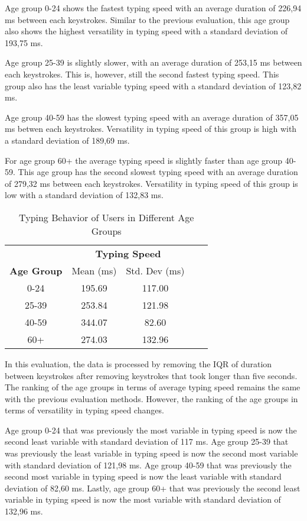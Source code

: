 Age group 0-24 shows the fastest typing speed with an average duration of 226,94 ms between each keystrokes.
Similar to the previous evaluation, this age group also shows the highest versatility in typing speed with a standard deviation of 193,75 ms.

Age group 25-39 is slightly slower, with an average duration of 253,15 ms between each keystrokes.
This is, however, still the second fastest typing speed.
This group also has the least variable typing speed with a standard deviation of 123,82 ms.

Age group 40-59 has the slowest typing speed with an average duration of 357,05 ms betwen each keystrokes.
Versatility in typing speed of this group is high with a standard deviation of 189,69 ms.

For age group 60+ the average typing speed is slightly faster than age group 40-59.
This age group has the second slowest typing speed with an average duration of 279,32 ms between each keystrokes.
Versatility in typing speed of this group is low with a standard deviation of 132,83 ms.

\begin{table}[h]
    \centering
    \begin{tabular}{ccccc}
    \toprule
    \multicolumn{1}{c}{} & \multicolumn{2}{c}{\textbf{Typing Speed}}\\
    \cmidrule(rl){2-3} \cmidrule(rl){4-5}
    \textbf{Age Group} & {Mean (ms)} & {Std. Dev (ms)} \\
    \midrule
    0-24 & 195.69 & 117.00 \\
    25-39 & 253.84 & 121.98  \\
    40-59 & 344.07 & 82.60  \\
    60+ & 274.03 & 132.96 \\
    \bottomrule
    \end{tabular}
    \caption{Typing Behavior of Users in Different Age Groups}
    \label{tab:typing_behavior_iqr}
\end{table}

In this evaluation, the data is processed by removing the \ac{IQR} of duration between keystrokes after removing keystrokes that took longer than five seconds.
The ranking of the age groups in terms of average typing speed remains the same with the previous evaluation methods.
However, the ranking of the age groups in terms of versatility in typing speed changes.

Age group 0-24 that was previously the most variable in typing speed is now the second least variable with standard deviation of 117 ms.
Age group 25-39 that was previously the least variable in typing speed is now the second most variable with standard deviation of 121,98 ms.
Age group 40-59 that was previously the second most variable in typing speed is now the least variable with standard deviation of 82,60 ms.
Lastly, age group 60+ that was previously the second least variable in typing speed is now the most variable with standard deviation of 132,96 ms. 

